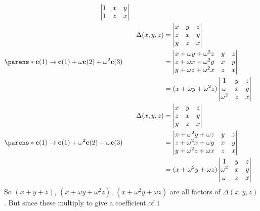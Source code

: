 \documentclass[fleqn,a4paper,11pt]{article}
\begin{document}
\begin{enumerate}[label=\textbf{\arabic*.}]
\begin{alignat*}
\begin{vmatrix}
     1 & x & y \\
     1 & z & x
    \end{vmatrix} \\
    && \Delta(x, y, z) &= \begin{vmatrix}
     x & y & z \\
     z & x & y \\
     y & z & x
    \end{vmatrix} \\
    \parens*{
     \vec c(1) \to \vec c(1) + \omega \vec c(2) + \omega^2 \vec c(3)
    } \quad
    && &= \begin{vmatrix}
     x + \omega y + \omega^2 z & y & z \\
     z + \omega x + \omega^2 y & x & y \\
     y + \omega z + \omega^2 x & z & x
    \end{vmatrix} \\
    && &= (x + \omega y + \omega^2 z)\begin{vmatrix}
     1 & y & z \\
     \omega & x & y \\
     \omega^2 & z & x
    \end{vmatrix} \\
    && \Delta(x, y, z) &= \begin{vmatrix}
     x & y & z \\
     z & x & y \\
     y & z & x
    \end{vmatrix} \\
    \parens*{
     \vec c(1) \to \vec c(1) + \omega^2 \vec c(2) + \omega \vec c(3)
    } \quad
    && &= \begin{vmatrix}
     x + \omega^2 y + \omega z & y & z \\
     z + \omega^2 x + \omega y & x & y \\
     y + \omega^2 z + \omega x & z & x
    \end{vmatrix} \\
    && &= (x + \omega^2 y + \omega z)\begin{vmatrix}
     1 & y & z \\
     \omega^2 & x & y \\
     \omega & z & x
    \end{vmatrix}
   \end{alignat*}
   So \((x + y + z)\), \((x + \omega y + \omega^2 z)\),
   \((x + \omega^2 y + \omega z)\) are all factors of
   \(\Delta(x, y, z)\). But since these multiply to give a coefficient of \(1\)

\end{enumerate}
\end{document}
